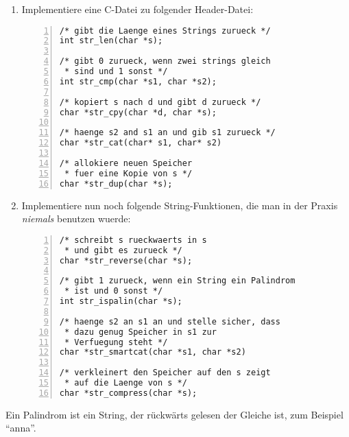 \begin{aufg}
\begin{enumerate}
\item Implementiere eine C-Datei zu folgender Header-Datei:
\begin{codelisting}
\begin{lstlisting}[numbers=left,numberstyle=\tiny,frame=tlrb]
/* gibt die Laenge eines Strings zurueck */
int str_len(char *s); 

/* gibt 0 zurueck, wenn zwei strings gleich 
 * sind und 1 sonst */
int str_cmp(char *s1, char *s2);

/* kopiert s nach d und gibt d zurueck */
char *str_cpy(char *d, char *s);

/* haenge s2 and s1 an und gib s1 zurueck */ 
char *str_cat(char* s1, char* s2)

/* allokiere neuen Speicher
 * fuer eine Kopie von s */
char *str_dup(char *s);
\end{lstlisting}
\end{codelisting}
\item Implementiere nun noch folgende String-Funktionen, die man in der Praxis \emph{niemals} benutzen wuerde:
\begin{codelisting}
\begin{lstlisting}[numbers=left,numberstyle=\tiny,frame=tlrb]
/* schreibt s rueckwaerts in s
 * und gibt es zurueck */
char *str_reverse(char *s);

/* gibt 1 zurueck, wenn ein String ein Palindrom
 * ist und 0 sonst */
int str_ispalin(char *s);

/* haenge s2 an s1 an und stelle sicher, dass
 * dazu genug Speicher in s1 zur
 * Verfuegung steht */
char *str_smartcat(char *s1, char *s2)

/* verkleinert den Speicher auf den s zeigt
 * auf die Laenge von s */
char *str_compress(char *s);
\end{lstlisting}
\end{codelisting}
\end{enumerate}
Ein Palindrom ist ein String, der rückwärts gelesen der Gleiche ist, zum
Beispiel ``anna''.
\end{aufg}
